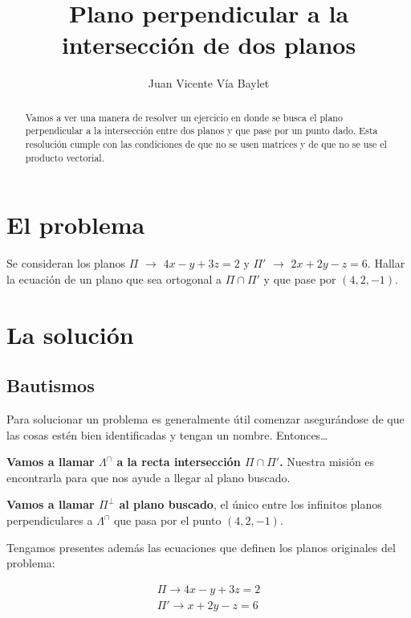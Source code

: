\documentclass[10pt,a4paper]{article}
\begin{document}
\title{Plano perpendicular a la intersección de dos planos}
\author{Juan Vicente Vía Baylet}
\maketitle

\begin{abstract}
  Vamos a ver una manera de resolver un ejercicio en donde se busca el plano perpendicular a la
  intersección entre dos planos y que pase por un punto dado.
  Esta resolución cumple con las condiciones de que no se usen matrices y
  de que no se use el producto vectorial.
\end{abstract}


\section{El problema}


Se consideran los planos $\Pi$ $\rightarrow$  $4x-y+3z=2$ y $\Pi'$ $\rightarrow$ $2x+2y-z=6$.
Hallar la ecuación de un plano que sea ortogonal a $\Pi\cap\Pi'$ y que pase por $(4,2,-1)$.


\section{La solución}



\subsection{Bautismos}


Para solucionar un problema es generalmente útil comenzar asegurándose de que las cosas
estén bien identificadas y tengan un nombre. Entonces\dots

\textbf{Vamos a llamar \textbf{$\Lambda^\cap$} a la recta intersección $\Pi\cap\Pi'$.} Nuestra misión es encontrarla para que nos ayude
a llegar al plano buscado.

\textbf{Vamos a llamar $\Pi^\perp$ al plano buscado}, el único entre los infinitos
planos perpendiculares a {$\Lambda^\cap$} que pasa por el punto $(4,2,-1)$.

Tengamos presentes además las ecuaciones que definen los planos originales del problema:

\begin{gather}
  \Pi \rightarrow 4x-y+3z=2 \label{eq:planopi}\\
  \Pi'\rightarrow x+2y-z=6 \label{eq:planopiprima}
\end{gather}
\end{document}
